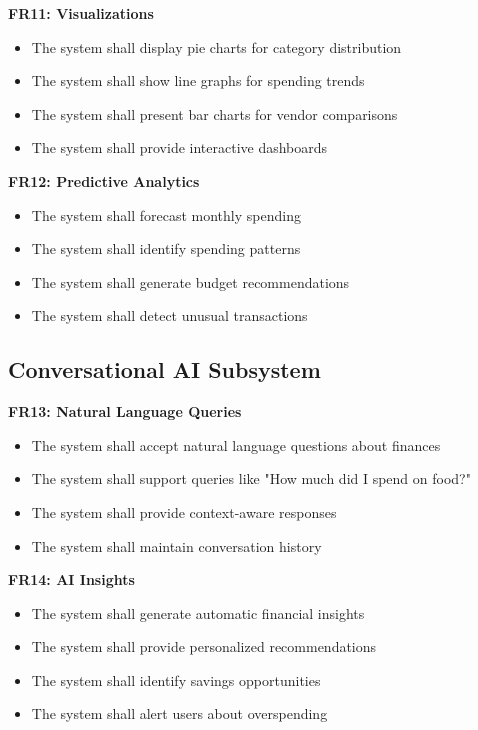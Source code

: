 \documentclass[11pt,a4paper]{report}
\begin{document}
\textbf{FR11: Visualizations}
\begin{itemize}
    \item The system shall display pie charts for category distribution
    \item The system shall show line graphs for spending trends
    \item The system shall present bar charts for vendor comparisons
    \item The system shall provide interactive dashboards
\end{itemize}

\textbf{FR12: Predictive Analytics}
\begin{itemize}
    \item The system shall forecast monthly spending
    \item The system shall identify spending patterns
    \item The system shall generate budget recommendations
    \item The system shall detect unusual transactions
\end{itemize}

\subsection{Conversational AI Subsystem}

\textbf{FR13: Natural Language Queries}
\begin{itemize}
    \item The system shall accept natural language questions about finances
    \item The system shall support queries like "How much did I spend on food?"
    \item The system shall provide context-aware responses
    \item The system shall maintain conversation history
\end{itemize}

\textbf{FR14: AI Insights}
\begin{itemize}
    \item The system shall generate automatic financial insights
    \item The system shall provide personalized recommendations
    \item The system shall identify savings opportunities
    \item The system shall alert users about overspending
\end{itemize}
\end{document}
